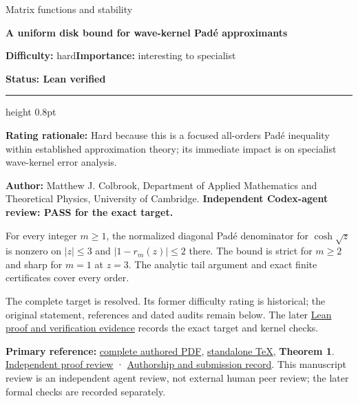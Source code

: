 \documentclass[11pt,a4paper]{article}
\makeatletter
\renewcommand{\subsection}{\Needspace{4\baselineskip}\@startsection{subsection}{2}{0pt}{9pt plus 1pt minus 1pt}{3pt}{\sffamily\bfseries\normalsize\color{ink}}}
\makeatother
\begin{document}
{\sffamily\small\color{muted}Matrix functions and stability\par}
\vspace{3pt}
{\raggedright{}\sffamily\bfseries\fontsize{21}{24}\selectfont\color{ink}A
uniform disk bound for wave-kernel Padé approximants\par}
\vspace{7pt}
{\sffamily\small\textbf{Difficulty:} hard\quad\textbf{Importance:} interesting
to specialist\par}
{\sffamily\small\bfseries\color{accent}Status: Lean verified\par}
\vspace{4pt}
{\color{accent}\hrule height 0.8pt}
\vspace{6pt}
\textbf{Rating rationale:} Hard because this is a focused all-orders
Padé inequality within established approximation theory; its immediate
impact is on specialist wave-kernel error analysis.

\subsection{Resolution --- 2026-09-11}\label{resolution-2026-09-11}

\textbf{Author:} Matthew J. Colbrook, Department of Applied Mathematics
and Theoretical Physics, University of Cambridge. \textbf{Independent
Codex-agent review: PASS for the exact target.}

For every integer \(m\ge1\), the normalized diagonal Padé denominator
for \(\cosh\sqrt z\) is nonzero on \(|z|\le3\) and \(|1-r_m(z)|\le2\)
there. The bound is strict for \(m\ge2\) and sharp for \(m=1\) at
\(z=3\). The analytic tail argument and exact finite certificates cover
every order.

The complete target is resolved. Its former difficulty rating is
historical; the original statement, references and dated audits remain
below. The later
\href{https://github.com/ajt60gaibb/OpenProblemsInNLA/blob/main/matrix-functions-and-stability/MF-03\#lean-proof-and-verification-evidence}{Lean
proof and verification evidence} records the exact target and kernel
checks.

\textbf{Primary reference:}
\href{https://github.com/ajt60gaibb/OpenProblemsInNLA/blob/main/references/colbrook-matrix-functions-2026-09-11/manuscripts/MF-03.pdf}{complete
authored PDF},
\href{https://github.com/ajt60gaibb/OpenProblemsInNLA/blob/main/references/colbrook-matrix-functions-2026-09-11/manuscripts/MF-03.tex}{standalone
TeX}, \textbf{Theorem 1}.
\href{https://github.com/ajt60gaibb/OpenProblemsInNLA/blob/main/references/colbrook-matrix-functions-2026-09-11/verification/reviews/MF-03-review.md}{Independent
proof review} ·
\href{https://github.com/ajt60gaibb/OpenProblemsInNLA/blob/main/references/colbrook-matrix-functions-2026-09-11/README.md}{Authorship
and submission record}. This manuscript review is an independent agent
review, not external human peer review; the later formal checks are
recorded separately.
\end{document}

